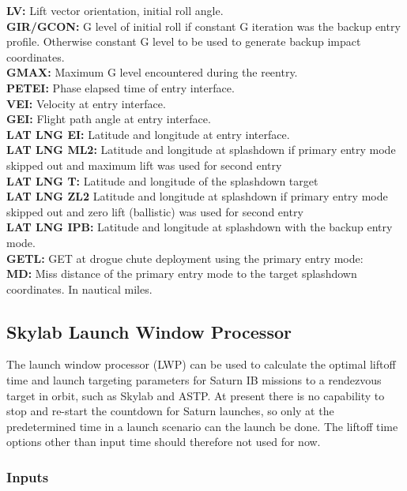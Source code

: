 \documentclass[11pt]{article} %
\begin{document}
\textbf{LV:} Lift vector orientation, initial roll angle.\\
\textbf{GIR/GCON:} G level of initial roll if constant G iteration was the backup entry profile. Otherwise constant G level to be used to generate backup impact coordinates.\\
\textbf{GMAX:} Maximum G level encountered during the reentry.\\
\textbf{PETEI:} Phase elapsed time of entry interface.\\
\textbf{VEI:} Velocity at entry interface.\\
\textbf{GEI:} Flight path angle at entry interface.\\  
\textbf{LAT LNG EI:} Latitude and longitude at entry interface.\\
\textbf{LAT LNG ML2:} Latitude and longitude at splashdown if primary entry mode skipped out and maximum lift was used for second entry\\
\textbf{LAT LNG T:} Latitude and longitude of the splashdown target\\
\textbf{LAT LNG ZL2} Latitude and longitude at splashdown if primary entry mode skipped out and zero lift (ballistic) was used for second entry\\
\textbf{LAT LNG IPB:} Latitude and longitude at splashdown with the backup entry mode.\\
\textbf{GETL:} GET at drogue chute deployment using the primary entry mode:\\
\textbf{MD:} Miss distance of the primary entry mode to the target splashdown coordinates. In nautical miles.\\

\newpage
\subsection{Skylab Launch Window Processor}

The launch window processor (LWP) can be used to calculate the optimal liftoff time and launch targeting parameters for Saturn IB missions to a rendezvous target in orbit, such as Skylab and ASTP. At present there is no capability to stop and re-start the countdown for Saturn launches, so only at the predetermined time in a launch scenario can the launch be done. The liftoff time options other than input time should therefore not used for now.\\

\subsubsection{Inputs}
\end{document}
